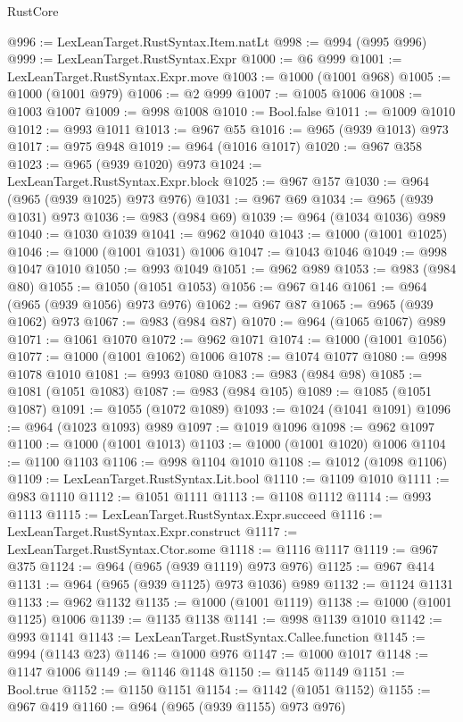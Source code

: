 \begin{lexlean}{RustCore}
\begin{coremodule}
@996 := LexLeanTarget.RustSyntax.Item.natLt
@998 := @994 (@995 @996)
@999 := LexLeanTarget.RustSyntax.Expr
@1000 := @6 @999
@1001 := LexLeanTarget.RustSyntax.Expr.move
@1003 := @1000 (@1001 @968)
@1005 := @1000 (@1001 @979)
@1006 := @2 @999
@1007 := @1005 @1006
@1008 := @1003 @1007
@1009 := @998 @1008
@1010 := Bool.false
@1011 := @1009 @1010
@1012 := @993 @1011
@1013 := @967 @55
@1016 := @965 (@939 @1013) @973
@1017 := @975 @948
@1019 := @964 (@1016 @1017)
@1020 := @967 @358
@1023 := @965 (@939 @1020) @973
@1024 := LexLeanTarget.RustSyntax.Expr.block
@1025 := @967 @157
@1030 := @964 (@965 (@939 @1025) @973 @976)
@1031 := @967 @69
@1034 := @965 (@939 @1031) @973
@1036 := @983 (@984 @69)
@1039 := @964 (@1034 @1036) @989
@1040 := @1030 @1039
@1041 := @962 @1040
@1043 := @1000 (@1001 @1025)
@1046 := @1000 (@1001 @1031) @1006
@1047 := @1043 @1046
@1049 := @998 @1047 @1010
@1050 := @993 @1049
@1051 := @962 @989
@1053 := @983 (@984 @80)
@1055 := @1050 (@1051 @1053)
@1056 := @967 @146
@1061 := @964 (@965 (@939 @1056) @973 @976)
@1062 := @967 @87
@1065 := @965 (@939 @1062) @973
@1067 := @983 (@984 @87)
@1070 := @964 (@1065 @1067) @989
@1071 := @1061 @1070
@1072 := @962 @1071
@1074 := @1000 (@1001 @1056)
@1077 := @1000 (@1001 @1062) @1006
@1078 := @1074 @1077
@1080 := @998 @1078 @1010
@1081 := @993 @1080
@1083 := @983 (@984 @98)
@1085 := @1081 (@1051 @1083)
@1087 := @983 (@984 @105)
@1089 := @1085 (@1051 @1087)
@1091 := @1055 (@1072 @1089)
@1093 := @1024 (@1041 @1091)
@1096 := @964 (@1023 @1093) @989
@1097 := @1019 @1096
@1098 := @962 @1097
@1100 := @1000 (@1001 @1013)
@1103 := @1000 (@1001 @1020) @1006
@1104 := @1100 @1103
@1106 := @998 @1104 @1010
@1108 := @1012 (@1098 @1106)
@1109 := LexLeanTarget.RustSyntax.Lit.bool
@1110 := @1109 @1010
@1111 := @983 @1110
@1112 := @1051 @1111
@1113 := @1108 @1112
@1114 := @993 @1113
@1115 := LexLeanTarget.RustSyntax.Expr.succeed
@1116 := LexLeanTarget.RustSyntax.Expr.construct
@1117 := LexLeanTarget.RustSyntax.Ctor.some
@1118 := @1116 @1117
@1119 := @967 @375
@1124 := @964 (@965 (@939 @1119) @973 @976)
@1125 := @967 @414
@1131 := @964 (@965 (@939 @1125) @973 @1036) @989
@1132 := @1124 @1131
@1133 := @962 @1132
@1135 := @1000 (@1001 @1119)
@1138 := @1000 (@1001 @1125) @1006
@1139 := @1135 @1138
@1141 := @998 @1139 @1010
@1142 := @993 @1141
@1143 := LexLeanTarget.RustSyntax.Callee.function
@1145 := @994 (@1143 @23)
@1146 := @1000 @976
@1147 := @1000 @1017
@1148 := @1147 @1006
@1149 := @1146 @1148
@1150 := @1145 @1149
@1151 := Bool.true
@1152 := @1150 @1151
@1154 := @1142 (@1051 @1152)
@1155 := @967 @419
@1160 := @964 (@965 (@939 @1155) @973 @976)

\end{coremodule}
\end{lexlean}
